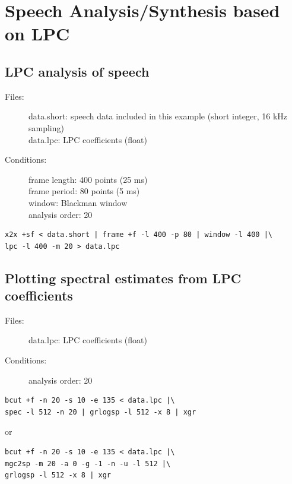 \documentclass[a4paper,10pt]{article}
\begin{document}
\section{Speech Analysis/Synthesis based on LPC}

\subsection{LPC analysis of speech}

\begin{description}
\item[Files:]
  data.short: speech data included in this example (short integer, 16 kHz sampling)\\
  data.lpc: LPC coefficients (float)
\item[Conditions:]
  frame length: 400 points (25 ms)\\
  frame period: 80 points (5 ms)\\
  window: Blackman window\\
  analysis order: 20
\end{description}

\begin{verbatim}
x2x +sf < data.short | frame +f -l 400 -p 80 | window -l 400 |\
lpc -l 400 -m 20 > data.lpc
\end{verbatim}

\subsection{Plotting spectral estimates from LPC coefficients}

\begin{description}
\item[Files:]
  data.lpc: LPC coefficients (float)
\item[Conditions:]
  analysis order: 20
\end{description}

\begin{verbatim}
bcut +f -n 20 -s 10 -e 135 < data.lpc |\
spec -l 512 -n 20 | grlogsp -l 512 -x 8 | xgr
\end{verbatim}

or

\begin{verbatim}
bcut +f -n 20 -s 10 -e 135 < data.lpc |\
mgc2sp -m 20 -a 0 -g -1 -n -u -l 512 |\
grlogsp -l 512 -x 8 | xgr
\end{verbatim}
\end{document}
